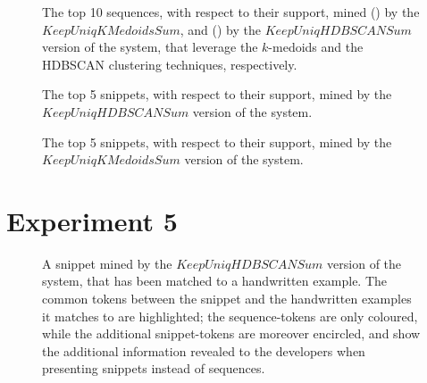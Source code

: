 \begin{figure}[!h]
\ffigbox
{%
  \begin{subfloatrow}[2]
  \ffigbox[\FBwidth]
    {\caption{}\label{listings:k-medoids-top-sequences}}{}
  \hspace{1em}%
  \ffigbox[\FBwidth]
    {\caption{}\label{listings:HDBSCAN-top-sequences}}{}
  \end{subfloatrow}}
  {\caption[Top 10 sequences mined by the $KeepUniqKMedoidsSum$, and the\protect\\$KeepUniqHDBSCANSum$ versions of the system]{The top 10 sequences, with respect to their support, mined () by the $KeepUniqKMedoidsSum$, and () by the $KeepUniqHDBSCANSum$ version of the system, that leverage the $k$-medoids and the HDBSCAN clustering techniques, respectively.}
\label{fig:clustering-top-sequences}}
\end{figure}

\begin{figure}[!h]

\vspace{-10pt}
\caption[Top 5 snippets mined by the $KeepUniqHDBSCANSum$ version of the system]{The top 5 snippets, with respect to their support, mined by the $KeepUniqHDBSCANSum$ version of the system.}
\label{listings:exp3-hdbscan-top-snippets}
\end{figure}

\begin{figure}[!h]

\vspace{-10pt}
\caption[Top 5 snippets mined by the $KeepUniqKMedoidsSum$ version of the system]{The top 5 snippets, with respect to their support, mined by the $KeepUniqKMedoidsSum$ version of the system.}
\label{listings:exp3-kmedoids-top-snippets}
\end{figure}

\clearpage

\section{Experiment 5}
\label{sec:exp5-qualitative}

\begin{figure}[!h]

\vspace{-10pt}
\caption[Additional tokens revealed when mining snippets instead of sequences]{A snippet mined by the $KeepUniqHDBSCANSum$ version of the system, that has been matched to a handwritten example. The common tokens between the snippet and the handwritten examples it matches to are highlighted; the sequence-tokens are only coloured, while the additional snippet-tokens are moreover encircled, and show the additional information revealed to the developers when presenting snippets instead of sequences.}
\label{listings:exp5-well-matched-hdbscan}
\end{figure}

